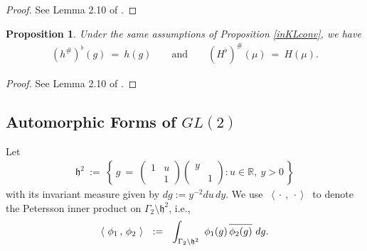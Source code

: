 \documentclass[11pt,reqno]{amsart}
\newtheorem{prop}[thm]{Proposition}
\theoremstyle{definition}
\theoremstyle{definition}
\theoremstyle{remark}
\newcommand{\R}{\ensuremath{\mathbb{R}}}
\numberwithin{equation}{section}
\newcommand{\ovA}[1]{\overline{#1\raisebox{3mm}{}}}
\begin{document}
		\begin{proof}
See Lemma 2.10 of \cite{Mo97}.
			\end{proof}
			
		
	
	
	\begin{prop}\label{plancherel}
		Under the same  assumptions of Proposition \ref{inKLconv}, we have
		\begin{align}
		(h^{\#})^{\flat}(g) \ = \ h(g)  \hspace{20pt} \text{ and } \hspace{20pt} 
		(H^{\flat})^{\#}(\mu) \ = \ H(\mu). 
		\end{align}
	\end{prop}
	
	\begin{proof}
		See Lemma 2.10 of \cite{Mo97}.
	\end{proof}
	

	

\subsection{Automorphic Forms of $GL(2)$}\label{autformgl2}
Let 
 \begin{align*}
 	\mathfrak{h}^2 \ := \ \left\{ \, g \ = \  \begin{pmatrix}
 		1 & u\\
 		& 1
 	\end{pmatrix} \begin{pmatrix}
 		y & \\
 		& 1
 	\end{pmatrix} : u \in \R, \ y >  0\,  \right\}
 \end{align*}
 with its invariant measure  given by $dg:=y^{-2} du \, dy$. We use  \ $\langle \ \cdot \ ,\  \cdot \ \rangle$ \ to denote the Petersson inner product on $\Gamma_{2}\setminus \mathfrak{h}^{2}$, i.e., 
 \begin{align*}
 	\left\langle \ \phi_{1} \, ,\,  \phi_{2} \ \right\rangle \ \ := \ \  \int_{\Gamma_{2}\setminus \mathfrak{h}^{2}} \ \phi_{1}(g) \, \ovA{\phi_{2}(g)} \ dg.
 \end{align*}
\end{document}
